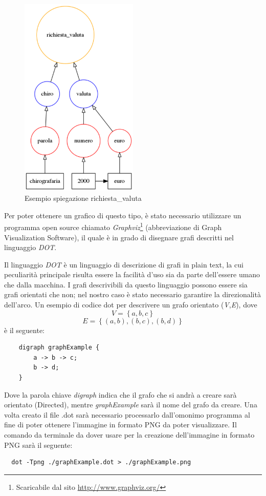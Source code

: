 \begin{figure}[H]
	\centering
	\includegraphics[width=0.5\textwidth]{img/tagRichiesta.png}
	\caption{Esempio spiegazione richiesta\_valuta}
\end{figure}

Per poter ottenere un grafico di questo tipo, è stato necessario utilizzare un programma open source chiamato \emph{Graphviz}\footnote{Scaricabile dal sito \url{http://www.graphviz.org/}} (abbreviazione di Graph Visualization Software), il quale è in grado di disegnare grafi descritti nel linguaggio \emph{DOT}.

Il linguaggio \emph{DOT} è un linguaggio di descrizione di grafi in plain text, la cui peculiarità principale risulta essere la facilità d'uso sia da parte dell'essere umano che dalla macchina. I grafi descrivibili da questo linguaggio possono essere sia grafi orientati che non; nel nostro caso è stato necessario garantire la direzionalità dell'arco.
\clearpage
Un esempio di codice dot per descrivere un grafo orientato (\emph{V},\emph{E}), dove 
$$V = \left\{ a,b,c \right\} $$
$$E = \left\{ \left( a,b \right) , \left( b,c \right) , \left( b,d \right) \right\} $$
è il seguente:

\begin{verbatim}
	digraph graphExample {
	    a -> b -> c;
	    b -> d;
	}
\end{verbatim}
Dove la parola chiave \emph{digraph} indica che il grafo che si andrà a creare sarà orientato (Directed), mentre \emph{graphExample} sarà il nome del grafo da creare.
Una volta creato il file .dot sarà necessario processarlo dall'omonimo programma al fine di poter ottenere l'immagine in formato PNG da poter visualizzare.
Il comando da terminale da dover usare per la creazione dell'immagine in formato PNG sarà il seguente:
\begin{verbatim}
  dot -Tpng ./graphExample.dot > ./graphExample.png
\end{verbatim}

